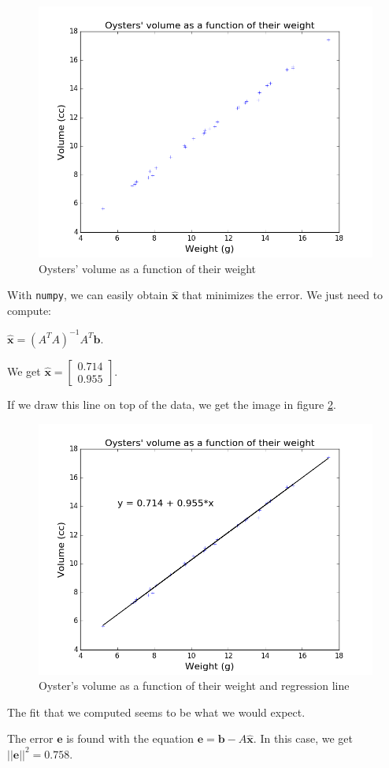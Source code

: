 \documentclass[]{article}
\begin{document}
\begin{figure}[h]
\centering
\includegraphics{30oysters_plain.png}
\caption{Oysters' volume as a function of their weight}
\label{30oysters_plain}
\end{figure}

With \texttt{numpy}, we can easily obtain $\widehat{\textbf{x}}$ that minimizes the error. We just need to compute:

$\widehat{\textbf{x}} = (A^TA)^{-1}A^T\textbf{b}$.

We get $\widehat{\textbf{x}} = \left[\begin{smallmatrix}0.714\\0.955\end{smallmatrix}\right]$.

If we draw this line on top of the data, we get the image in figure \ref{30oysters_reg}.

\begin{figure}[h]
\centering
\includegraphics{30oysters_reg.png}
\caption{Oyster's volume as a function of their weight and regression line}
\label{30oysters_reg}
\end{figure}

The fit that we computed seems to be what we would expect.

The error $\textbf{e}$ is found with the equation $\textbf{e} = \textbf{b} - A\widehat{\textbf{x}}$. In this case, we get $||\textbf{e}||^2 = 0.758$.
\end{document}
